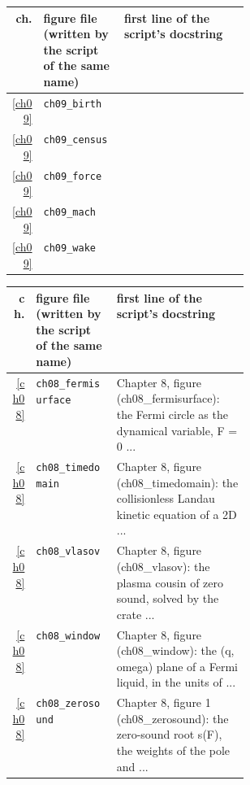 \begin{center}\footnotesize\setlength{\tabcolsep}{3pt}\begin{tabularx}{\linewidth}{@{}r>{\raggedright}p{0.34\linewidth}>{\raggedright\arraybackslash}X@{}}\toprule ch. & figure file (written by the script of the same name) & first line of the script's docstring\\\midrule
\ref{ch09} & \texttt{ch09\_\allowbreak{}birth} &  \\
\ref{ch09} & \texttt{ch09\_\allowbreak{}census} &  \\
\ref{ch09} & \texttt{ch09\_\allowbreak{}force} &  \\
\ref{ch09} & \texttt{ch09\_\allowbreak{}mach} &  \\
\ref{ch09} & \texttt{ch09\_\allowbreak{}wake} &  \\
\bottomrule\end{tabularx}\end{center}
\begin{center}\footnotesize\setlength{\tabcolsep}{3pt}\begin{tabularx}{\linewidth}{@{}r>{\raggedright}p{0.34\linewidth}>{\raggedright\arraybackslash}X@{}}\toprule ch. & figure file (written by the script of the same name) & first line of the script's docstring\\\midrule
\ref{ch08} & \texttt{ch08\_\allowbreak{}fermisurface} & Chapter 8,\allowbreak{} figure (ch08\_\allowbreak{}fermisurface): the Fermi circle as the dynamical variable,\allowbreak{} F = 0 .\allowbreak{}.\allowbreak{}.\allowbreak{} \\
\ref{ch08} & \texttt{ch08\_\allowbreak{}timedomain} & Chapter 8,\allowbreak{} figure (ch08\_\allowbreak{}timedomain): the collisionless Landau kinetic equation of a 2D .\allowbreak{}.\allowbreak{}.\allowbreak{} \\
\ref{ch08} & \texttt{ch08\_\allowbreak{}vlasov} & Chapter 8,\allowbreak{} figure (ch08\_\allowbreak{}vlasov): the plasma cousin of zero sound,\allowbreak{} solved by the crate .\allowbreak{}.\allowbreak{}.\allowbreak{} \\
\ref{ch08} & \texttt{ch08\_\allowbreak{}window} & Chapter 8,\allowbreak{} figure (ch08\_\allowbreak{}window): the (q,\allowbreak{} omega) plane of a Fermi liquid,\allowbreak{} in the units of .\allowbreak{}.\allowbreak{}.\allowbreak{} \\
\ref{ch08} & \texttt{ch08\_\allowbreak{}zerosound} & Chapter 8,\allowbreak{} figure 1 (ch08\_\allowbreak{}zerosound): the zero-\allowbreak{}sound root s(F),\allowbreak{} the weights of the pole and .\allowbreak{}.\allowbreak{}.\allowbreak{} \\
\bottomrule\end{tabularx}\end{center}
